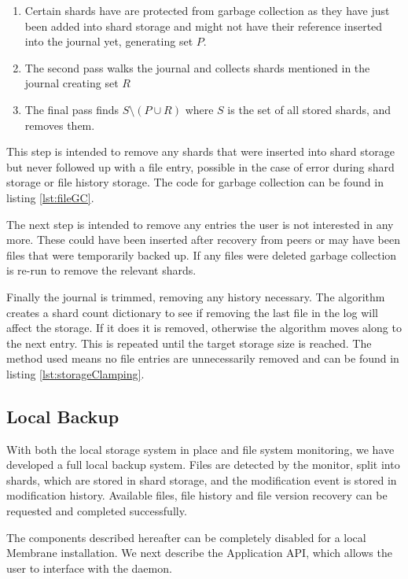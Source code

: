 \documentclass[11pt, a4paper, twoside]{report}
\begin{document}
\begin{enumerate}
 \item Certain shards have are protected from garbage collection as they have just been added into shard storage and might not have their reference inserted into the journal yet, generating set $P$.
 \item The second pass walks the journal and collects shards mentioned in the journal creating set $R$
 \item The final pass finds $S \setminus (P \cup R)$ where $S$ is the set of all stored shards, and removes them.
\end{enumerate}

This step is intended to remove any shards that were inserted into shard storage but never followed up with a file entry, possible in the case of error during shard storage or file history storage. The code for garbage collection can be found in listing \ref{lst:fileGC}.

The next step is intended to remove any entries the user is not interested in any more. These could have been inserted after recovery from peers or may have been files that were temporarily backed up. If any files were deleted garbage collection is re-run to remove the relevant shards.

Finally the journal is trimmed, removing any history necessary. The algorithm creates a shard count dictionary to see if removing the last file in the log will affect the storage. If it does it is removed, otherwise the algorithm moves along to the next entry. This is repeated until the target storage size is reached. The method used means no file entries are unnecessarily removed and can be found in listing \ref{lst:storageClamping}.

\subsection{Local Backup}

With both the local storage system in place and file system monitoring, we have developed a full local backup system. Files are detected by the monitor, split into shards, which are stored in shard storage, and the modification event is stored in modification history. Available files, file history and file version recovery can be requested and completed successfully.

The components described hereafter can be completely disabled for a local Membrane installation. We next describe the Application API, which allows the user to interface with the daemon.
\end{document}
